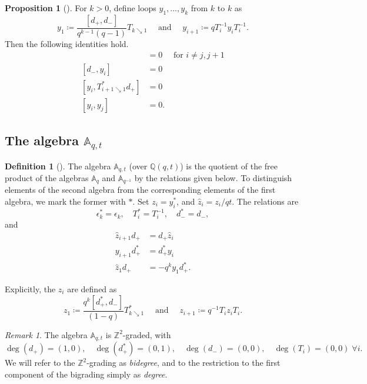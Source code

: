 \documentclass[reqno]{amsart}
\theoremstyle{plain}
\theoremstyle{definition}
\newtheorem{definition}[theorem]{Definition}
\newtheorem{proposition}[theorem]{Proposition}
\theoremstyle{remark}
\newtheorem{remark}[theorem]{Remark}
\newcommand{\Q}{\mathbb{Q}}
\newcommand{\A}{\mathbb{A}}%
\newcommand{\z}{\widehat{z}}
\newcommand{\<}{\langle}
\renewcommand{\>}{\rangle}
\begin{document}
\begin{proposition}[{\cite[Lemma~5.5]{CarlssonMellit2018ShuffleConjecture}}]
    For $k > 0$, define loops $y_1, \dots, y_k$ from $k$ to $k$ as
    \[ y_1 \coloneqq \frac{[d_+,d_-]}{q^{k-1}(q-1)}T_{k \searrow 1} \quad \text{ and } \quad y_{i+1} \coloneqq q T_i^{-1} y_i T_i^{-1}. \]
    Then the following identities hold.
    \begin{align}
        [y_i, T_j] & = 0 \quad \text{ for } i \neq j, j+1  \label{eq:yT_comm} \\
        [d_-, y_i] & = 0 \label{eq:yd-_comm} \\
        [y_i, T^*_{i+1 \searrow 1} d_+] & = 0 \label{eq:yd+_comm} \\
        [y_i,y_j] & = 0. \label{eq:yy_comm}
    \end{align}
\end{proposition}

\subsection{The algebra \texorpdfstring{$\A_{q,t}$}{Aqt}}

\begin{definition}[{\cite[Definition~3.9]{Mellit2021Rational}}]
    \label{def:Aqt}
    The algebra $\A_{q,t}$ (over $\Q(q,t)$) is the quotient of the free product of the algebras $\A_q$ and $\A_{q^{-1}}$ by the relations given below. To distinguish elements of the second algebra from the corresponding elements of the first algebra, we mark the former with $*$. Set $z_i = y_i^*$, and $\z_i = z_i/qt$. The relations are
    \[ \epsilon_k^* = \epsilon_k, \quad T_i^* = T_i^{-1}, \quad d_-^* = d_-, \]
    and
    \begin{align}
        \z_{i+1} d_+ & = d_+ \z_i \label{eq:r10} \tag{Q1} \\
        y_{i+1} d_+^* & = d_+^* y_i \label{eq:r10*} \tag{Q1*} \\
        \z_1 d_+ & = - q^k y_1 d_+^*. \label{eq:r11} \tag{Q2}
    \end{align}
\end{definition}

Explicitly, the $z_i$ are defined as
\[ z_1 \coloneqq \frac{q^k [d_+^*,d_-]}{(1-q)}T_{k \searrow 1}^* \quad \text{ and } \quad z_{i+1} \coloneqq q^{-1} T_i z_i T_i. \]

\begin{remark}
    The algebra $\A_{q,t}$ is $\mathbb{Z}^2$-graded, with
    \[ \deg(d_+) = (1,0), \quad \deg(d_+^*) = (0,1), \quad \deg(d_-) = (0,0), \quad \deg(T_i) = (0,0) \; \forall i. \]
    We will refer to the $\mathbb{Z}^2$-grading as \emph{bidegree}, and to the restriction to the first component of the bigrading simply as \emph{degree}.
\end{remark}
\end{document}

